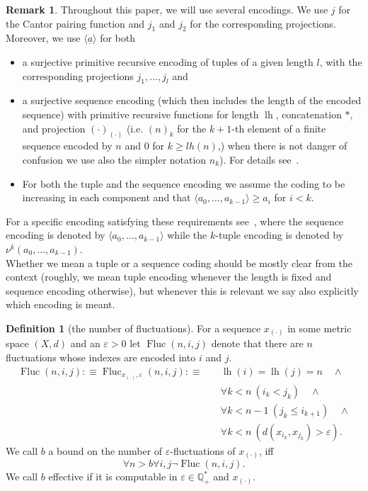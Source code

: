 \documentclass[1p]{elsarticle}
\DeclareMathOperator{\lh}{lh}  %
\DeclareMathOperator{\Fluc}{Fluc}
\newcommand{\QQ}{\ensuremath{\mathbb{Q}}}
\newcommand{\tup}{\underline} %
\theoremstyle{plain}
\theoremstyle{definition}
\newtheorem{dfn}[thm]{Definition}
\newtheorem{rmk}[thm]{Remark}
\theoremstyle{remark}
\renewcommand{\epsilon}{\varepsilon}
\theoremstyle{definition}
\begin{document}
\begin{rmk} \label{remark-coding}
Throughout this paper, we will use several encodings. We use $j$ for the Cantor pairing function and $j_1$ and $j_2$ for the corresponding
projections. Moreover, we use $\langle \tup a \rangle$ for both
\begin{itemize}
\item a surjective primitive recursive 
encoding of tuples of a given length $l$, with the corresponding projections $j_1,\ldots,j_l$ and
\item 
a surjective sequence encoding (which then includes the length of the encoded sequence) with primitive recursive functions for length $\lh$, concatenation $*$, 
and projection $(\cdot)_{(\cdot)}$ (i.e. $(n)_k$ for the $k+1$-th element 
of a finite sequence encoded by $n$ and $0$ for $k\ge lh(n)$,) 
when there is not danger of confusion we use also the simpler notation $n_k$). 
For details see~\cite{Kohlenbach(book)}.
\item 
For both the tuple and the sequence encoding we assume the coding to be 
increasing in each component and that $\langle a_0,\ldots,a_{k-1}\rangle 
\ge a_i$ for $i<k.$
\end{itemize}
For a specific encoding satisfying these requirements 
see~\cite{Kohlenbach(book)}, where the sequence
encoding is denoted by $\langle a_0,\ldots,a_{k-1}\rangle$ while the
$k$-tuple encoding is denoted by $\nu^k(a_0,\ldots,a_{k-1})$. \\[1mm] Whether we mean a tuple or a sequence 
coding should be mostly clear from the context (roughly, we mean tuple encoding whenever the length is fixed and sequence encoding otherwise), but whenever this is relevant we say also explicitly which encoding is meant.
\end{rmk}

\begin{dfn}[the number of fluctuations]
For a sequence $x_{(\cdot)}$ in some metric space $(X,d)$ and an $\epsilon>0$
let $\Fluc(n,i,j)$ denote that there are $n$ fluctuations whose indexes are encoded into $i$ and $j$.
\begin{align*}
\Fluc(n,i,j):\equiv\Fluc_{x_{(\cdot)},\epsilon}(n,i,j):\equiv\quad &\lh(i)=\lh(j)=n\quad \wedge\\ 
&\forall k<n\ (i_k<j_k) \quad \wedge\\
&\forall k<n-1\ (j_k\leq i_{k+1}) \quad \wedge\\
&\forall k<n\ (d(x_{i_k},x_{j_k})>\epsilon).
\end{align*}
We call $b$ a bound on the number of $\epsilon$-fluctuations of $x_{(\cdot)}$, iff 
\[
\forall n>b \forall i,j \neg\Fluc(n,i,j).
\]
We call $b$ effective if it is computable in $\epsilon\in\QQ^*_+$ and $x_{(\cdot)}$.
\end{dfn}
\end{document}
